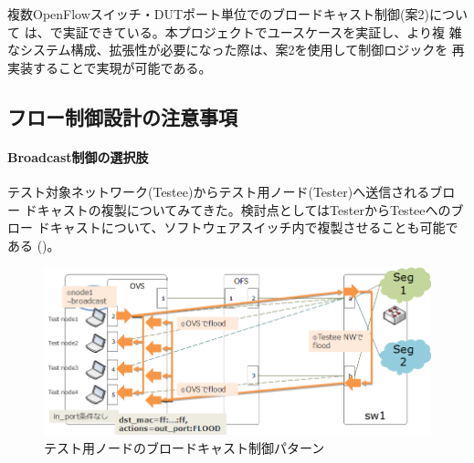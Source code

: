 複数OpenFlowスイッチ・DUTポート単位でのブロードキャスト制御(案2)について
は、\lopj で実証できている。本プロジェクトでユースケースを実証し、より複
雑なシステム構成、拡張性が必要になった際は、案2を使用して制御ロジックを
再実装することで実現が可能である。

  \subsection{フロー制御設計の注意事項}

  \paragraph{Broadcast制御の選択肢}

テスト対象ネットワーク(Testee)からテスト用ノード(Tester)へ送信されるブロー
ドキャストの複製についてみてきた。検討点としてはTesterからTesteeへのブロー
ドキャストについて、ソフトウェアスイッチ内で複製させることも可能である
()。

\begin{figure}[h]
 \centering
 \includegraphics[scale=0.6]{img/l2bcctrl_another_pattern.png}
 \caption{テスト用ノードのブロードキャスト制御パターン}
 \label{fig:bcctrl_another_pattern}
\end{figure}

